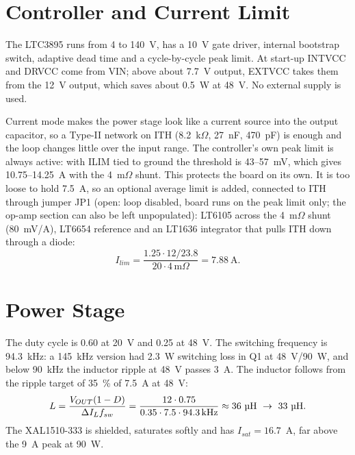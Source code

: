 \documentclass[12pt, a4paper]{report}
\begin{document}
\section{Controller and Current Limit}

The LTC3895 \cite{ltc3895} runs from 4 to 140~V, has a 10~V gate driver, internal bootstrap switch, adaptive dead time and a cycle-by-cycle peak limit. At start-up INTVCC and DRVCC come from VIN; above about 7.7~V output, EXTVCC takes them from the 12~V output, which saves about 0.5~W at 48~V. No external supply is used.

Current mode makes the power stage look like a current source into the output capacitor, so a Type-II network on ITH (8.2~k\(\Omega\), 27~nF, 470~pF) is enough and the loop changes little over the input range. The controller's own peak limit is always active: with ILIM tied to ground the threshold is 43--57~mV, which gives 10.75--14.25~A with the 4~m\(\Omega\) shunt. This protects the board on its own. It is too loose to hold 7.5~A, so an optional average limit is added, connected to ITH through jumper JP1 (open: loop disabled, board runs on the peak limit only; the op-amp section can also be left unpopulated): LT6105 \cite{lt6105} across the 4~m\(\Omega\) shunt (80~mV/A), LT6654 reference \cite{lt6654} and an LT1636 integrator \cite{lt1636} that pulls ITH down through a diode:
\[
I_{lim}=\frac{1.25\cdot 12/23.8}{20\cdot 4\,\text{m}\Omega}=7.88\ \text{A}.
\]

\section{Power Stage}

The duty cycle is 0.60 at 20~V and 0.25 at 48~V. The switching frequency is 94.3~kHz: a 145~kHz version had 2.3~W switching loss in Q1 at 48~V/90~W, and below 90~kHz the inductor ripple at 48~V passes 3~A. The inductor follows from the ripple target of 35~\% of 7.5~A at 48~V:
\[
L=\frac{V_{OUT}(1-D)}{\Delta I_L f_{sw}}=\frac{12\cdot0.75}{0.35\cdot7.5\cdot94.3\,\text{kHz}}\approx 36\ \text{\textmu H}\ \rightarrow\ 33\ \text{\textmu H}.
\]
The XAL1510-333 \cite{xal1510} is shielded, saturates softly and has \(I_{sat}=16.7\)~A, far above the 9~A peak at 90~W.
\end{document}
